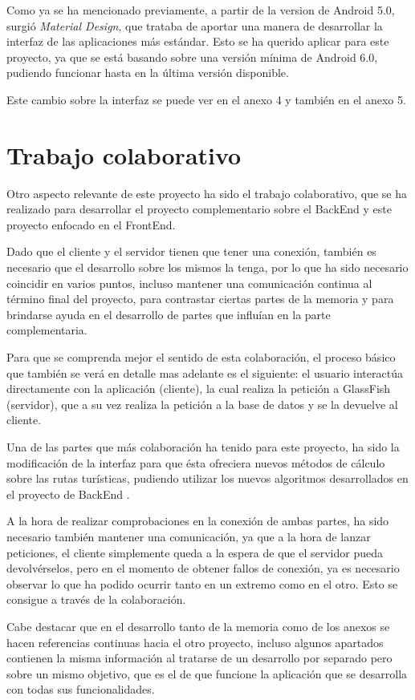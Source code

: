 Como ya se ha mencionado previamente, a partir de la version de Android 5.0, surgió \textit{Material Design}, que trataba de aportar una manera de desarrollar la interfaz de las aplicaciones más estándar. Esto se ha querido aplicar para este proyecto, ya que se está basando sobre una versión mínima de Android 6.0, pudiendo funcionar hasta en la última versión disponible.

Este cambio sobre la interfaz se puede ver en el anexo 4 y también en el anexo 5.

\section{Trabajo colaborativo}
 
Otro aspecto relevante de este proyecto ha sido el trabajo colaborativo, que se ha realizado para desarrollar el proyecto complementario sobre el BackEnd \cite{tfg2} y este proyecto enfocado en el FrontEnd.

Dado que el cliente y el servidor tienen que tener una conexión, también es necesario que el desarrollo sobre los mismos la tenga, por lo que ha sido necesario coincidir en varios puntos, incluso mantener una comunicación continua al término final del proyecto, para contrastar ciertas partes de la memoria y para brindarse ayuda en el desarrollo de partes que influían en la parte complementaria.

Para que se comprenda mejor el sentido de esta colaboración, el proceso básico que también se verá en detalle mas adelante es el siguiente: el usuario interactúa directamente con la aplicación (cliente), la cual realiza la petición a GlassFish (servidor), que a su vez realiza la petición a la base de datos y se la devuelve al cliente. 

Una de las partes que más colaboración ha tenido para este proyecto, ha sido la modificación de la interfaz para que ésta ofreciera nuevos métodos de cálculo sobre las rutas turísticas, pudiendo utilizar los nuevos algoritmos desarrollados en el proyecto de BackEnd \cite{tfg2}.

A la hora de realizar comprobaciones en la conexión de ambas partes, ha sido necesario también mantener una comunicación, ya que a la hora de lanzar peticiones, el cliente simplemente queda a la espera de que el servidor pueda devolvérselos, pero en el momento de obtener fallos de conexión, ya es necesario observar lo que ha podido ocurrir tanto en un extremo como en el otro. Esto se consigue a través de la colaboración.

Cabe destacar que en el desarrollo tanto de la memoria como de los anexos se hacen referencias continuas hacia el otro proyecto, incluso algunos apartados contienen la misma información al tratarse de un desarrollo por separado pero sobre un mismo objetivo, que es el de que funcione la aplicación que se desarrolla con todas sus funcionalidades.